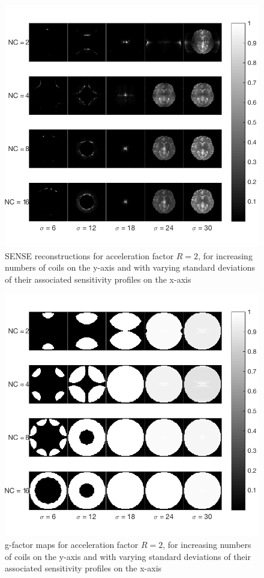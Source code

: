 \begin{figure}[H]
    \centering
    \includegraphics[width=1\textwidth,keepaspectratio]{R2brainsb}
    \caption{SENSE reconstructions for acceleration factor $R = 2$, for increasing numbers of coils on the y-axis and with varying standard deviations of their associated sensitivity profiles on the x-axis}
    \label{fig:R2brains}
\end{figure}

\begin{figure}[H]
    \centering
    \includegraphics[width=1\textwidth,keepaspectratio]{R2gfactb}
    \caption{g-factor maps for acceleration factor $R = 2$, for increasing numbers of coils on the y-axis and with varying standard deviations of their associated sensitivity profiles on the x-axis}
    \label{fig:R2gfact}
\end{figure}

